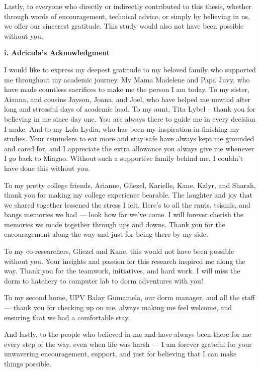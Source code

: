 Lastly, to everyone who directly or indirectly contributed to this thesis, whether through words of encouragement, technical advice, or simply by believing in us, we offer our sincerest gratitude. This study would also not have been possible without you.

\vspace{0.5cm}
\noindent\textbf{i. Adricula's Acknowledgment} \\
\vspace{-0.5cm}

I would like to express my deepest gratitude to my beloved family who supported me throughout my academic journey. My Mama Madelene and Papa Juvy, who have made countless sacrifices to make me the person I am today. To my sister, Aianna, and cousins Jayson, Joana, and Joel, who have helped me unwind after long and stressful days of academic load. To my aunt, Tita Lybel – thank you for believing in me since day one. You are always there to guide me in every decision I make. And to my Lola Lydia, who has been my inspiration in finishing my studies. Your reminders to eat more and stay safe have always kept me grounded and cared for, and I appreciate the extra allowance you always give me whenever I go back to Miagao. Without such a supportive family behind me, I couldn’t have done this without you.

To my pretty college friends, Arianne, Gliezel, Karielle, Kane, Kzlyr, and Sharah, thank you for making my college experience bearable. The laughter and joy that we shared together lessened the stress I felt. Here’s to all the rants, tsismis, and bangs memories we had — look how far we’ve come. I will forever cherish the memories we made together through ups and downs. Thank you for the encouragement along the way and just for being there by my side.

To my co-researchers, Gliezel and Kane, this would not have been possible without you. Your insights and passion for this research inspired me along the way. Thank you for the teamwork, initiatives, and hard work. I will miss the dorm to hatchery to computer lab to dorm adventures with you!

To my second home, UPV Balay Gumamela, our dorm manager, and all the staff — thank you for checking up on me, always making me feel welcome, and ensuring that we had a comfortable stay.

And lastly, to the people who believed in me and have always been there for me every step of the way, even when life was harsh — I am forever grateful for your unwavering encouragement, support, and just for believing that I can make things possible.

